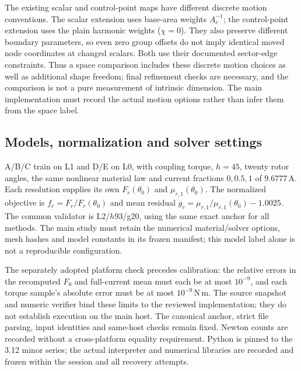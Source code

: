 The existing scalar and control-point maps have different discrete motion
conventions. The scalar extension uses base-area weights $A_e^{-1}$;
the control-point extension uses the plain harmonic weights ($\chi=0$).
They also preserve different boundary parameters, so even zero group offsets
do not imply identical moved node coordinates at changed scalars.
Both use their documented sector-edge constraints. Thus a space comparison
includes these discrete motion choices as well as additional shape freedom;
final refinement checks are necessary, and the comparison is not a pure
measurement of intrinsic dimension. The main implementation must record the
actual motion options rather than infer them from the space label.

\subsection{Models, normalization and solver settings}

A/B/C train on L1 and D/E on L0, with coupling torque, $h=45$, twenty rotor
angles, the same nonlinear material law and current fractions $0,0.5,1$ of
$9.6777\,\mathrm{A}$. Each resolution supplies its own $F_r(\theta_0)$ and
$\mu_{r,1}(\theta_0)$. The normalized objective is
$f_r=F_r/F_r(\theta_0)$ and mean residual
$g_r=\mu_{r,1}/\mu_{r,1}(\theta_0)-1.0025$.
The common validator is L2/$h93$/g20, using the same exact anchor for all
methods. The main study must retain the numerical material/solver options,
mesh hashes and model constants in its frozen manifest; this model label
alone is not a reproducible configuration.

The separately adopted platform check precedes calibration: the relative
errors in the recomputed $F_0$ and full-current mean must each be at most
$10^{-9}$, and each torque sample's absolute error must be at most
$10^{-9}\,\mathrm{N\,m}$. The source snapshot and numeric verifier bind these
limits to the reviewed implementation; they do not establish execution on
the main host. The canonical anchor, strict file parsing, input identities
and same-host checks remain fixed. Newton counts are recorded without a
cross-platform equality requirement. Python is pinned to the 3.12 minor
series; the actual interpreter and numerical libraries are recorded and
frozen within the session and all recovery attempts.


